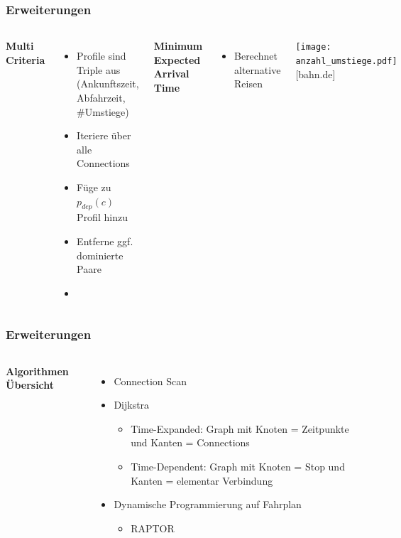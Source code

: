 \documentclass[aspectratio=169]{beamer}
\begin{document}
\begin{frame}
\frametitle{Erweiterungen}
\begin{columns}[c] %
	
	\textbf{Multi Criteria}
	\begin{itemize}
		\item Profile sind Triple aus \\ (Ankunftszeit, Abfahrzeit, \#Umstiege)
		\item Iteriere über alle Connections
		\item Füge zu $p_{dep}(c)$ Profil hinzu
		\item Entferne ggf. dominierte Paare
		\item []
	\end{itemize}
	\textbf{Minimum Expected Arrival Time}
	\begin{itemize}
		\item Berechnet alternative Reisen
	\end{itemize}
	\texttt{[image: anzahl\_umstiege.pdf]}
	\centering
	\tiny [bahn.de]
	  
\end{columns}
\end{frame}
	

	
\begin{frame}
\frametitle{Erweiterungen}
\begin{columns}[c] %
	
	\textbf{Algorithmen Übersicht}
	\begin{itemize}
		\item Connection Scan
		\item Dijkstra
		\begin{itemize}
			\item Time-Expanded: Graph mit Knoten = Zeitpunkte und Kanten = Connections
			\item Time-Dependent: Graph mit Knoten = Stop und Kanten = elementar Verbindung
		\end{itemize}
		\item Dynamische Programmierung auf Fahrplan
		\begin{itemize}
			\item RAPTOR
		\end{itemize}
	\end{itemize}

		
\end{columns}
\end{frame}
	
\end{document}
